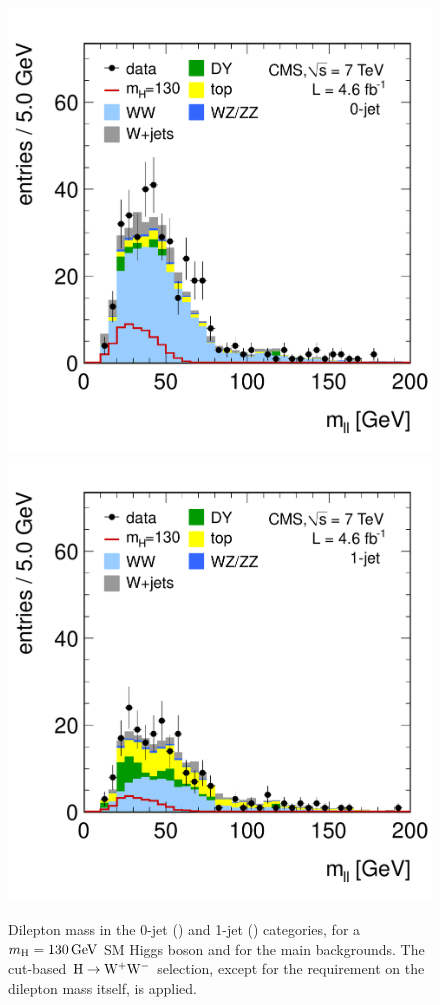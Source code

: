 \documentclass[12pt,twoside,a4paper,cmspaper,final,collab]{cms-tdr}
\begin{document}
\begin{figure}[htbp]
\begin{center}
  \includegraphics[width=\cmsFigWidth]{mll_all_lin_0j}
  \includegraphics[width=\cmsFigWidth]{mll_all_lin_1j}
	 \caption{Dilepton mass
	 in the 0-jet (\cmsLeft) and 1-jet (\cmsRight) categories,
       for a $m_{\mathrm{H}}=130\,\text{Ge\hspace{-.08em}V}$ SM Higgs boson and for the main backgrounds.
       The cut-based $\mathrm{H}\to\mathrm{W^+}{}\mathrm{W^-}$ selection, except for the requirement on the dilepton mass itself, is applied.}  \label{fig:mllHWW}
\end{center}
\end{figure}
\end{document}
